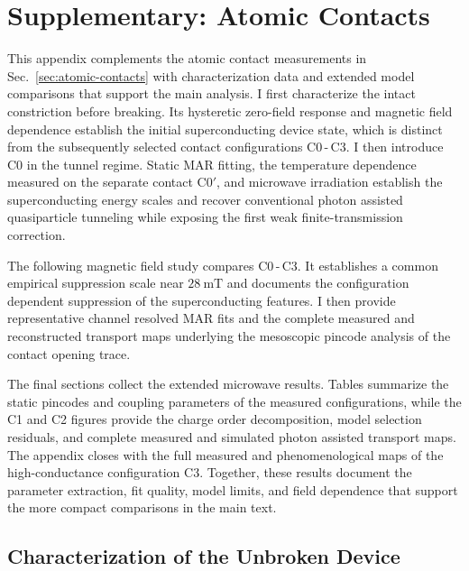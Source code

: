 \chapter{Supplementary: Atomic Contacts}
\label{appendix:ac}

    This appendix complements the atomic contact measurements in Sec.~\ref{sec:atomic-contacts} with characterization data and extended model comparisons that support the main analysis. I first characterize the intact constriction before breaking. Its hysteretic zero-field response and magnetic field dependence establish the initial superconducting device state, which is distinct from the subsequently selected contact configurations C0\,-\,C3. I then introduce C0 in the tunnel regime. Static MAR fitting, the temperature dependence measured on the separate contact C0$'$, and microwave irradiation establish the superconducting energy scales and recover conventional photon assisted quasiparticle tunneling while exposing the first weak finite-transmission correction.

    The following magnetic field study compares C0\,-\,C3. It establishes a common empirical suppression scale near $\qty{28}{\milli\tesla}$ and documents the configuration dependent suppression of the superconducting features. I then provide representative channel resolved MAR fits and the complete measured and reconstructed transport maps underlying the mesoscopic pincode analysis of the contact opening trace.

    The final sections collect the extended microwave results. Tables summarize the static pincodes and coupling parameters of the measured configurations, while the C1 and C2 figures provide the charge order decomposition, model selection residuals, and complete measured and simulated photon assisted transport maps. The appendix closes with the full measured and phenomenological maps of the high-conductance configuration C3. Together, these results document the parameter extraction, fit quality, model limits, and field dependence that support the more compact comparisons in the main text.

    \section{Characterization of the Unbroken Device}
    \label{sec:appendix:ac:unbroken}

